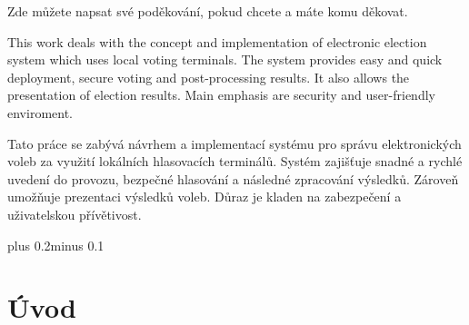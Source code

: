 \documentclass[11pt,twoside,a4paper]{book}
\begin{document}

\coverpagestarts


\acknowledgements
\noindent
Zde můžete napsat své poděkování, pokud chcete a máte komu děkovat.





 
\abstractpage

This work deals with the concept and implementation of electronic election system which uses local voting terminals. The system provides easy and quick deployment, secure voting and post-processing results. It also allows the presentation of election results. Main emphasis are security and user-friendly enviroment.


\baselineskip

Tato práce se zabývá návrhem a implementací systému pro správu elektronických voleb za využití lokálních hlasovacích terminálů. Systém zajišťuje snadné a rychlé uvedení do provozu, bezpečné hlasování a následné zpracování výsledků. Zároveň umožňuje prezentaci výsledků voleb. Důraz je kladen na zabezpečení a uživatelskou přívětivost.


\tableofcontents



\listoffigures



\listoftables



\mainbodystarts
\normalfont
{}\baselineskip plus 0.2\baselineskip minus 0.1\baselineskip

 



\chapter{Úvod}
\end{document}
